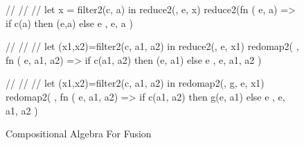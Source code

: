\begin{figure}[bt]
\begin{colorcode}
//
//
//
let x = filter2(c, a)
in  reduce2(\mymath{\oplus}, e, x)
    \emphh{\mymath{\equiv}}
reduce2(fn \mymath{\beta} (\mymath{\beta} e, \mymath{\beta} a) =>
  if c(a) then \mymath{\oplus}(e,a) else e
, e, a )

//
//
//
let (x1,x2)=filter2(c, a1, a2)
in  reduce2(\mymath{\oplus}, e, x1)
    \emphh{\mymath{\equiv}}
redomap2(\mymath{\oplus}
, fn \mymath{\beta} (\mymath{\beta} e,  a1,  a2)
   => if c(a1, a2)
      then \mymath{\oplus}(e, a1) else e
, e, a1, a2 )

//
//
//
let (x1,x2)=filter2(c, a1, a2)
in  redomap2(\mymath{\oplus}, g, e, x1)
    \emphh{\mymath{\equiv}}
redomap2(\mymath{\oplus}
, fn \mymath{\beta} (\mymath{\beta} e,  a1,  a2)
   => if c(a1, a2)
      then g(e, a1) else e
, e, a1, a2 )
\end{colorcode}
\caption{Compositional Algebra For Fusion}
\label{fig:fusion-algebra}
\end{figure}

